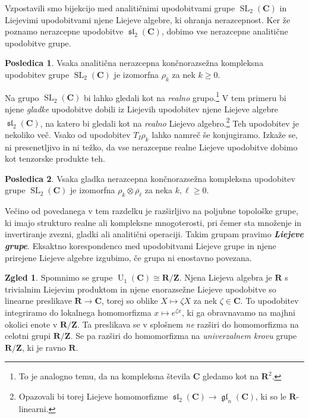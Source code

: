 \documentclass[11pt]{book}
\def\ZZ{\mathbf{Z}}
\def\RR{\mathbf{R}}
\def\CC{\mathbf{C}}
\DeclareMathOperator\glfrak{\mathfrak{gl}}
\DeclareMathOperator\slfrak{\mathfrak{sl}}
\DeclareMathOperator\U{U}
\DeclareMathOperator\SL{SL}
\def\definicija{\color{rdeca}\bf\em}
\theoremstyle{definition}
\theoremstyle{zgled}
\newtheorem*{zgled}{Zgled}
\theoremstyle{odprtproblem}
\theoremstyle{domacanaloga}
\theoremstyle{izrek}
\newtheorem*{posledica}{Posledica}
\begin{document}
Vzpostavili smo bijekcijo med analitičnimi upodobitvami grupe $\SL_2(\CC)$ in Liejevimi upodobitvami njene Liejeve algebre, ki ohranja nerazcepnost. Ker že poznamo nerazcepne upodobitve $\slfrak_2(\CC)$, dobimo vse nerazcepne analitične upodobitve grupe.

\begin{posledica}
Vsaka analitična nerazcepna končnorazsežna kompleksna upodobitev grupe $\SL_2(\CC)$ je izomorfna $\rho_k$ za nek $k \geq 0$.
\end{posledica}

Na grupo $\SL_2(\CC)$ bi lahko gledali kot na \emph{realno} grupo.\footnote{To je analogno temu, da na kompleksna števila $\CC$ gledamo kot na $\RR^2$.} V tem primeru bi njene \emph{gladke} upodobitve dobili iz Liejevih upodobitev njene Liejeve algebre $\slfrak_2(\CC)$, na katero bi gledali kot na \emph{realno} Liejevo algebro.\footnote{Opazovali bi torej Liejeve homomorfizme $\slfrak_2(\CC) \to \glfrak_n(\CC)$, ki so le $\RR$-linearni.} Teh upodobitev je nekoliko več. Vsako od upodobitev $T_I \rho_k$ lahko namreč še konjugiramo. Izkaže se, ni presenetljivo in ni težko, da vse nerazcepne realne Liejeve upodobitve dobimo kot tenzorske produkte teh.

\begin{posledica}
Vsaka gladka nerazcepna končnorazsežna kompleksna upodobitev grupe $\SL_2(\CC)$ je izomorfna $\rho_k \otimes \overline{\rho_{\ell}}$ za neka $k, \ell \geq 0$.
\end{posledica}

Večino od povedanega v tem razdelku je razširljivo na poljubne topološke grupe, ki imajo strukturo realne ali kompleksne mnogoterosti, pri čemer sta množenje in invertiranje zvezni, gladki ali analitični operaciji. Takim grupam pravimo {\definicija Liejeve grupe}. Eksaktno korespondenco med upodobitvami Liejeve grupe in njene prirejene Liejeve algebre izgubimo, če grupa ni enostavno povezana. 

\begin{zgled}
Spomnimo se grupe $\U_1(\CC) \cong \RR/\ZZ$. Njena Liejeva algebra je $\RR$ s trivialnim Liejevim produktom in njene enorazsežne Liejeve upodobitve so linearne preslikave $\RR \to \CC$, torej so oblike $X \mapsto \zeta X$ za nek $\zeta \in \CC$. To upodobitev integriramo do lokalnega homomorfizma $x \mapsto e^{\zeta x}$, ki ga obravnavamo na majhni okolici enote v $\RR/\ZZ$. Ta preslikava se v splošnem \emph{ne} razširi do homomorfizma na celotni grupi $\RR/\ZZ$. Se pa razširi do homomorfizma na \emph{univerzalnem krovu} grupe $\RR/\ZZ$, ki je ravno $\RR$.
\end{zgled}
\end{document}
